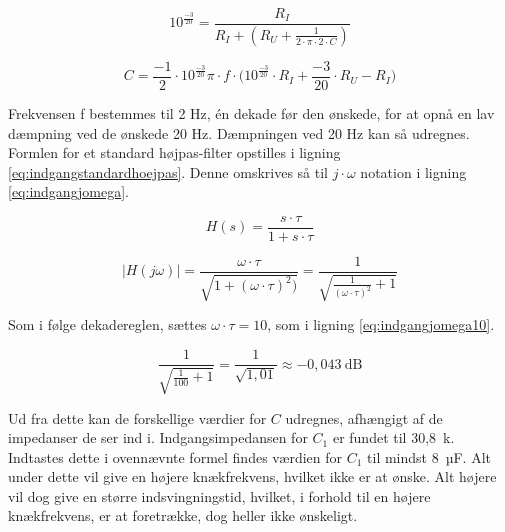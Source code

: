 \begin{equation}
\label{eq:indgang2pif}
10^{\frac{-3}{20}}=\frac{R_I}{R_I+(R_U+\frac{1}{2\cdot\pi\cdot 2\cdot C})}
\end{equation}

\begin{equation}
\label{eq:indgangcudregning}
C=\frac{-1}{2}\cdot{10^{\frac{-3}{20}}}{\pi\cdot f\cdot(10^{\frac{-3}{20}}\cdot R_I+\frac{-3}{20}}\cdot R_U - R_I)
\end{equation}

Frekvensen f bestemmes til 2 Hz, én dekade før den ønskede, for at opnå en lav dæmpning ved de ønskede 20 Hz. Dæmpningen ved 20 Hz kan så udregnes. Formlen for et standard højpas-filter opstilles i ligning \ref{eq:indgangstandardhoejpas}. Denne omskrives så til $j\cdot\omega$ notation i ligning \ref{eq:indgangjomega}.

\begin{equation}
\label{eq:indgangstandardhoejpas}
H(s)=\frac{s\cdot\tau}{1+s\cdot\tau}
\end{equation}

\begin{equation}
\label{eq:indgangjomega}
|H(j\omega)|=\frac{\omega\cdot\tau}{\sqrt{1+(\omega\cdot\tau)^2)}}=\frac{1}{\sqrt{\frac{1}{(\omega\cdot\tau)^2}+1}}
\end{equation}

Som i følge dekadereglen, sættes $\omega\cdot\tau = 10$, som i ligning \ref{eq:indgangjomega10}.

\begin{equation}
\label{eq:indgangjomega10}
\frac{1}{\sqrt{\frac{1}{100}+1}}=\frac{1}{\sqrt{1,01}}\approx -0,043~\mathrm{dB}
\end{equation}

Ud fra dette kan de forskellige værdier for $C$ udregnes, afhængigt af de impedanser de ser ind i.
Indgangsimpedansen for $C_1$ er fundet til 30,8~k\ohm . Indtastes dette i ovennævnte formel findes værdien for $C_1$ til mindst 8~µF. Alt under dette vil give en højere knækfrekvens, hvilket ikke er at ønske. Alt højere vil dog give en større indsvingningstid, hvilket, i forhold til en højere knækfrekvens, er at foretrække, dog heller ikke ønskeligt.


